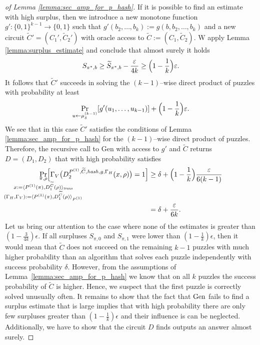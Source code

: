 \begin{proof}[of Lemma \ref{lemma:sec_amp_for_p_hash}]
If it is possible to find an estimate with high surplus, then we introduce a new monotone function $g': \{0,1\}^{k-1} \rightarrow \{0,1\}$
such that $g'(b_2, \dots, b_k) := g(b, b_2, \dots, b_k)$ and a new circuit $\widetilde{C}' = (C_1', \widetilde{C}_2')$
with oracle access to $\widetilde{C} := (C_1, \widetilde{C}_2)$.
W apply Lemma \ref{lemma:surplus_estimate} and conclude that almost surely it holds
\begin{align*}
S_{\pi^*,b} \geq \widetilde{S}_{\pi^*, b} - \frac{\epsilon}{4k} \geq \Bigl(1 - \frac{1}{k}\Bigr)\epsilon.
\end{align*}
It follows that $\widetilde{C}'$ succeeds in solving the $(k\!-\!1)$--wise direct product of puzzles with probability at least
\begin{align*}
\Pr_{u \leftarrow \mu^{(k-1)}_{\delta}}[g'(u_1,\dots, u_{k-1} )] + \Bigl(1 - \frac{1}{k}\Bigr)\epsilon.
\end{align*}
We see that in this case $\widetilde{C}'$ satisfies the conditions of Lemma \ref{lemma:sec_amp_for_p_hash} for the $(k\!-\!1)$--wise direct product of puzzles.
Therefore, the recursive call to Gen with access to $g'$ and $\widetilde{C}$ returns $D = (D_1, D_2)$ that with high probability satisfies
\begin{align}
  \underset{
    \mathclap{
      \substack{
        \pi, \rho \\
        x := \langle P^{(1)}(\pi), D_1^{\widetilde{C}}(\rho) \rangle_{\mathit{trans}} \\
        (\Gamma_H, \Gamma_V) := \langle P^{(1)}(\pi), D_1^{\widetilde{C}}(\rho) \rangle_{P^{(1)}}}}}
  {\Pr}\Big[\Gamma_V\big(D_2^{P^{(1)}, \widetilde{C}, \hash, g, \Gamma_H}(x, \rho)\big) = 1\Big]
  &\geq \delta + \Bigl(1 - \frac{1}{k}\Bigr)\frac{\epsilon}{6(k-1)} \notag\\
  &= \delta + \frac{\epsilon}{6k}.
\end{align}
%
Let us bring our attention to the case where none of the estimates is greater than $(1-\frac{3}{4k})\epsilon$.
If all surpluses $S_{\pi,0}$ and $S_{\pi,1}$ were lower than $(1-\frac{1}{k})\epsilon$, then it would mean that $\widetilde{C}$
does not succeed on the remaining $k-1$ puzzles with much higher probability than an algorithm that solves each puzzle
independently with success probability $\delta$. However, from the assumptions of Lemma~\ref{lemma:sec_amp_for_p_hash}
we know that on all $k$ puzzles the success probability of $\widetilde{C}$ is higher.
Hence, we suspect that the first puzzle is correctly solved unusually often.
It remains to show that the fact that $\Gen$ fails to find a surplus estimate that is large implies that
with high probability there are only few surpluses greater than $(1-\frac{1}{k})\epsilon$ and their influence
is can be neglected. Additionally, we have to show that the circuit $D$ finds outputs an answer almost surely.


\end{proof}
